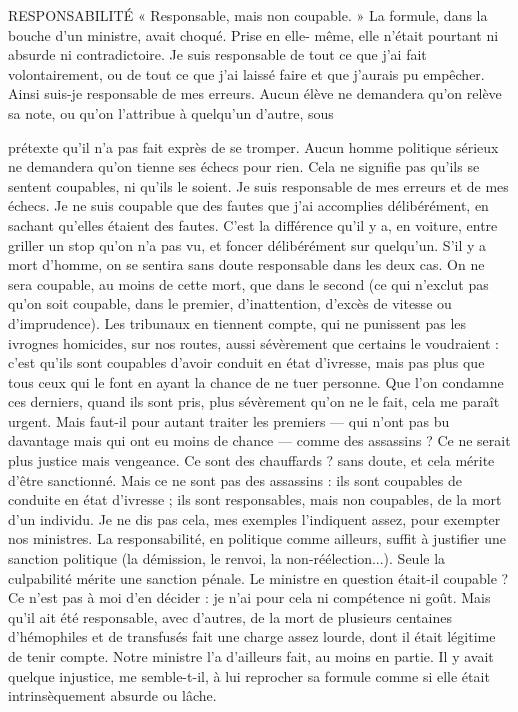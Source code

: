 RESPONSABILITÉ « Responsable, mais non coupable. » La formule, dans
la bouche d’un ministre, avait choqué. Prise en elle-
même, elle n’était pourtant ni absurde ni contradictoire. Je suis responsable de
tout ce que j'ai fait volontairement, ou de tout ce que j’ai laissé faire et que
j'aurais pu empêcher. Ainsi suis-je responsable de mes erreurs. Aucun élève ne
demandera qu’on relève sa note, ou qu’on l’attribue à quelqu'un d’autre, sous

prétexte qu’il n’a pas fait exprès de se tromper. Aucun homme politique sérieux
ne demandera qu’on tienne ses échecs pour rien. Cela ne signifie pas qu’ils se
sentent coupables, ni qu’ils le soient. Je suis responsable de mes erreurs et de
mes échecs. Je ne suis coupable que des fautes que j’ai accomplies délibérément,
en sachant qu’elles étaient des fautes. C’est la différence qu’il y a, en voiture,
entre griller un stop qu’on n’a pas vu, et foncer délibérément sur quelqu'un.
S’il y a mort d'homme, on se sentira sans doute responsable dans les deux cas.
On ne sera coupable, au moins de cette mort, que dans le second (ce qui
n'exclut pas qu’on soit coupable, dans le premier, d’inattention, d’excès de
vitesse ou d’imprudence). Les tribunaux en tiennent compte, qui ne punissent
pas les ivrognes homicides, sur nos routes, aussi sévèrement que certains le
voudraient : c’est qu’ils sont coupables d’avoir conduit en état d'ivresse, mais
pas plus que tous ceux qui le font en ayant la chance de ne tuer personne. Que
l’on condamne ces derniers, quand ils sont pris, plus sévèrement qu’on ne le
fait, cela me paraît urgent. Mais faut-il pour autant traiter les premiers — qui
n'ont pas bu davantage mais qui ont eu moins de chance — comme des
assassins ? Ce ne serait plus justice mais vengeance. Ce sont des chauffards ?
sans doute, et cela mérite d’être sanctionné. Mais ce ne sont pas des assassins :
ils sont coupables de conduite en état d’ivresse ; ils sont responsables, mais
non coupables, de la mort d’un individu. Je ne dis pas cela, mes exemples
l’indiquent assez, pour exempter nos ministres. La responsabilité, en politique
comme ailleurs, suffit à justifier une sanction politique (la démission, le
renvoi, la non-réélection...). Seule la culpabilité mérite une sanction pénale.
Le ministre en question était-il coupable ? Ce n’est pas à moi d’en décider : je
n'ai pour cela ni compétence ni goût. Mais qu’il ait été responsable, avec
d’autres, de la mort de plusieurs centaines d’hémophiles et de transfusés fait
une charge assez lourde, dont il était légitime de tenir compte. Notre ministre
l’a d’ailleurs fait, au moins en partie. Il y avait quelque injustice, me semble-t-il,
à lui reprocher sa formule comme si elle était intrinsèquement absurde ou
lâche.

